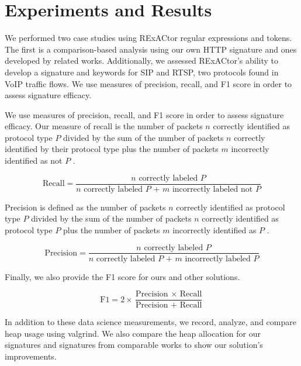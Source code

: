 \section{Experiments and Results}

We performed two case studies using RExACtor regular expressions and tokens. The first is a comparison-based analysis using our own HTTP signature and ones developed by related works. Additionally, we assessed RExACtor's ability to develop a signature and keywords for SIP and RTSP, two protocols found in VoIP traffic flows. We use measures of precision, recall, and F1 score in order to assess signature efficacy.

We use measures of precision, recall, and F1 score in order to assess signature efficacy. Our measure of recall is the number of packets $n$ correctly identified as protocol type $P$ divided by the sum of the number of packets $n$ correctly identified by their protocol type plus the number of packets $m$ incorrectly identified as not $P$ \cite{Zhang}.

\vspace{\baselineskip}
\[\text{Recall} = \frac{\text{$n$ correctly labeled $P$}}{\text{$n$ correctly labeled $P$ + $m$ incorrectly labeled not $P$}}\] \par
\vspace{\baselineskip}

Precision is defined as the number of packets $n$ correctly identified as protocol type $P$ divided by the sum of the number of packets $n$ correctly identified as protocol type $P$ plus the number of packets $m$ incorrectly identified as $P$ \cite{Zhang}.

\vspace{\baselineskip}
\[\text{Precision} = \frac{\text{$n$ correctly labeled $P$}}{\text{$n$ correctly labeled $P$ + $m$ incorrectly labeled $P$}}\] \par
\vspace{\baselineskip}

Finally, we also provide the F1 score for ours and other solutions.

\vspace{\baselineskip}
\[\text{F1} = 2 \times \frac{\text{Precision $\times$ Recall}}{\text{Precision + Recall}}\] \par
\vspace{\baselineskip}

In addition to these data science measurements, we record, analyze, and compare heap usage using valgrind. We also compare the heap allocation for our signatures and signatures from comparable works to show our solution's improvements.

